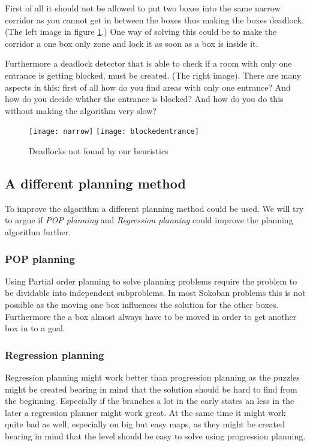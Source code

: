 First of all it should not be allowed to put two boxes into the same
narrow corridor as you cannot get in between the boxes thus making the
boxes deadlock. (The left image in figure \ref{fig:missingdeadlocks}.)
One way of solving this could be to make the corridor a one box only
zone and lock it as soon as a box is inside it.

Furthermore a deadlock detector that is able to check if a room with
only one entrance is getting blocked, must be created. (The right
image). There are many aspects in this: first of all how do you find
areas with only one entrance? And how do you decide whther the
entrance is blocked? And how do you do this without making the
algorithm very slow?

\begin{figure}[htp]
  \centering
  \texttt{[image: narrow]}
  \texttt{[image: blockedentrance]}
  \caption{Deadlocks not found by our heuristics}
  \label{fig:missingdeadlocks}
\end{figure}

\subsection{A different planning method}
To improve the algorithm a different planning method could be used. We will try to argue if \textit{POP planning} and \textit{Regression planning} could improve the planning algorithm further.
\subsubsection{POP planning}
Using Partial order planning to solve planning problems require the problem to be dividable into independent subproblems. In most Sokoban problems this is not possible as the moving one box influences the solution for the other boxes. Furthermore the a box almost always have to be moved in order to get another box in to a goal.

\subsubsection{Regression planning}
Regression planning might work better than progression planning as the puzzles might be created bearing in mind that the solution should be hard to find from the beginning. Especially if the branches a lot in the early states an less in the later a regression planner might work great. At the same time it might work quite bad as well, especially on big but easy maps, as they might be created bearing in mind that the level should be easy to solve using progression planning.

